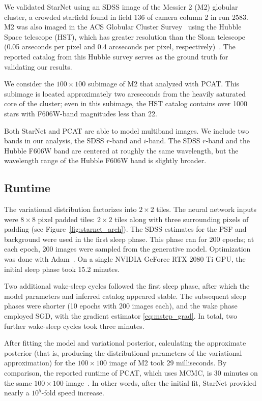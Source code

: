 \label{sec:results_on_m2}
We validated StarNet using an SDSS image of the Messier 2 (M2) globular cluster, a crowded starfield found in field 136 of camera column 2 in run 2583.
M2 was also imaged in the ACS Globular Cluster Survey~\cite{Sarajedini_2007}
using the Hubble Space telescope (HST),
which has greater resolution than the Sloan telescope (0.05 arseconds per pixel and 0.4 arcseconds per pixel, respectively)~\cite{hubble_about, sdss_about}. The reported catalog from this Hubble survey serves as the ground truth for validating our results.

We consider the $100 \times 100$ subimage of M2 that \cite{Portillo_2017, Feder_2019} analyzed with PCAT.
This subimage is located approximately two arcseconds from the heavily saturated core of the cluster;
even in this subimage, the HST catalog contains over 1000 stars with F606W-band magnitudes less than 22.

Both StarNet and PCAT are able to model multiband images. We include two bands in our analysis, the SDSS $r$-band and $i$-band. 
The SDSS $r$-band and the Hubble F606W band are centered at roughly the same wavelength, but the wavelength range of the Hubble F606W band is slightly broader. 

\subsection{Runtime} 
\label{sec:runtime}
The variational distribution factorizes into $2\times2$ tiles. 
The neural network inputs were $8\times8$ pixel padded tiles: 
$2\times 2$ tiles along with three surrounding pixels of padding (see Figure~\ref{fig:starnet_arch}). 
The SDSS estimates for the PSF and background were used in the first sleep phase. 
This phase ran for 200 epochs; at each epoch, 200 images were sampled from the generative model. 
Optimization was done with Adam~\cite{kingma2014adam}. 
On a single NVIDIA GeForce RTX 2080 Ti GPU, 
the initial sleep phase took 15.2 minutes.

Two additional wake-sleep cycles followed the first sleep phase, 
after which the model parameters and inferred catalog appeared stable.
The subsequent sleep phases were shorter (10 epochs with 200 images each), and the wake phase employed SGD, with the gradient estimator \eqref{eq:mstep_grad}. In total, two further wake-sleep cycles took three minutes. 

After fitting the model and variational posterior, calculating the approximate posterior (that is, producing the distributional parameters of the variational approximation) for the $100 \times 100$ image of M2 took $29$ milliseconds. 
By comparison, the reported runtime of PCAT, which uses MCMC, is 30 minutes on the same $100 \times 100$ image~\cite{Feder_2019}.
In other words, after the initial fit, StarNet provided nearly a $10^5$-fold speed increase. 

